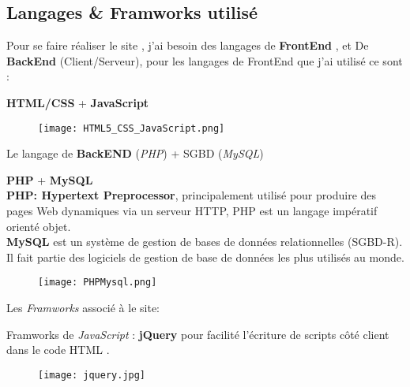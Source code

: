 \documentclass[a4paper,12pt]{report}
\begin{document}
\subsection{Langages \& Framworks utilisé}
Pour se faire réaliser le site , j'ai besoin des langages de \textbf{FrontEnd} , et De \textbf{BackEnd} (Client/Serveur),
pour les langages de FrontEnd que j'ai utilisé ce sont :
\begin{tcolorbox}
\textbf{HTML/CSS} + \textbf{JavaScript}
\begin{figure}[H]
\begin{center}
\centering
\texttt{[image: HTML5\_CSS\_JavaScript.png]}
\end{center}
\label{FrontEnd_Languages}
\end{figure}
\end{tcolorbox}
Le langage de \textbf{BackEND} (\textit{PHP}) + SGBD (\textit{MySQL})
\begin{tcolorbox}
\textbf{PHP} + \textbf{MySQL} \\
\textbf{PHP: Hypertext Preprocessor}, principalement utilisé pour produire des pages Web dynamiques via un serveur HTTP, PHP est un langage impératif orienté objet. \\
\textbf{MySQL} est un système de gestion de bases de données relationnelles (SGBD-R). Il fait partie des logiciels de gestion de base de données les plus utilisés au monde.
\begin{figure}[H]
\begin{center}
\centering
\texttt{[image: PHPMysql.png]}
\end{center}
\label{BackEnd_Languages}
\end{figure}
\end{tcolorbox}
Les \textit{Framworks} associé à le site:
\begin{tcolorbox}
Framworks de \textit{JavaScript} : \textbf{jQuery} pour facilité l'écriture de scripts côté client dans le code HTML .
\begin{figure}[H]
\begin{center}
\centering
\texttt{[image: jquery.jpg]}
\end{center}
\label{FJQ}
\end{figure}
\end{tcolorbox}
\end{document}
